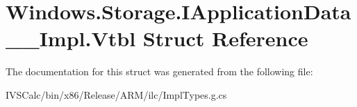 \hypertarget{struct_windows_1_1_storage_1_1_i_application_data_____impl_1_1_vtbl}{}\section{Windows.\+Storage.\+I\+Application\+Data\+\_\+\+\_\+\+Impl.\+Vtbl Struct Reference}
\label{struct_windows_1_1_storage_1_1_i_application_data_____impl_1_1_vtbl}


The documentation for this struct was generated from the following file\+:\begin{DoxyCompactItemize}
\item 
I\+V\+S\+Calc/bin/x86/\+Release/\+A\+R\+M/ilc/Impl\+Types.\+g.\+cs\end{DoxyCompactItemize}
